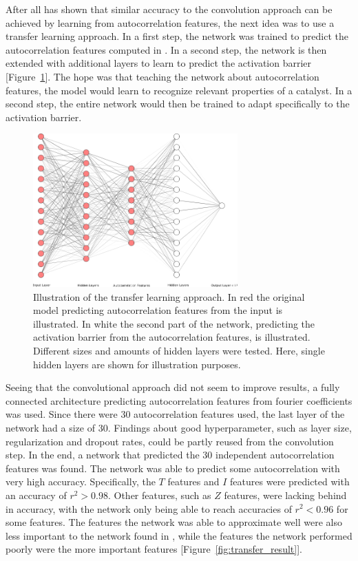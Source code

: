 After all \cite{friederich_dos} has shown that similar accuracy to the convolution approach can be achieved by learning from autocorrelation features,
the next idea was to use a transfer learning approach.
In a first step, the network was trained to predict the autocorrelation features computed in \cite{friederich_dos}.
In a second step, the network is then extended with additional layers to learn to predict the activation barrier [Figure~\ref{fig:transferlearn}].
The hope was that teaching the network about autocorrelation features, the model would learn to recognize relevant properties of a catalyst.
In a second step, the entire network would then be trained to adapt specifically to the activation barrier.
\\

\begin{figure} [!b]
    \centering
    \includegraphics[width=0.7\textwidth]{figures/regression/fourier/nn.png} 
    \caption[Transfer learning model]{Illustration of the transfer learning approach.
        In red the original model predicting autocorrelation features from the input is illustrated.
        In white the second part of the network, predicting the activation barrier from the autocorrelation features, is illustrated.
        Different sizes and amounts of hidden layers were tested. Here, single hidden layers are shown for illustration purposes.
    }
    \label{fig:transferlearn}
\end{figure}

Seeing that the convolutional approach did not seem to improve results, a fully connected architecture predicting autocorrelation features from fourier coefficients 
was used.
Since there were 30 autocorrelation features used, the last layer of the network had a size of 30.
Findings about good hyperparameter, such as layer size, regularization and dropout rates, could be partly reused from the convolution step.
In the end, a network that predicted the 30 independent autocorrelation features was found.
The network was able to predict some autocorrelation with very high accuracy. Specifically, the $T$ features and $I$ features were
predicted with an accuracy of $r^2 > 0.98$. 
Other features, such as $Z$ features, were lacking behind in accuracy, with the network only being able to reach accuracies of $r^2<0.96$ for some features.
The features the network was able to approximate well were also less important to the network found in \cite{friederich_dos}, while the features 
the network performed poorly were the more important features [Figure~\ref{fig:transfer_result}].

